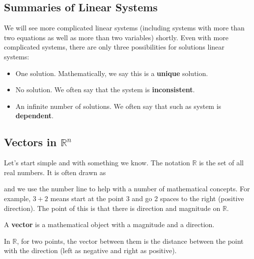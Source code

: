\subsection{Summaries of Linear Systems}

We will see more complicated linear systems (including systems with  more than two equations as well as more than two variables) shortly.  Even with more complicated systems, there are only three  possibilities for solutions linear systems:

\begin{itemize}
  \item One solution.  Mathematically, we say this is a \textbf{unique} solution.
  \item No solution.  We often say that the system is \textbf{inconsistent}. 
  \item An infinite number of solutions.  We often say that such as system is \textbf{dependent}.   
\end{itemize}

\subsection{Vectors in $\mathbb{R}^n$}

Let's start simple and with something we know.  The notation $\mathbb{R}$ is the set of all real numbers.  It is often drawn as
%
\begin{center}
\end{center}
and we use the number line to help with a number of mathematical concepts.  For example, $3 + 2$ means start at the point $3$ and go 2 spaces to the right (positive direction).  The point of this is that there is direction and magnitude on $\mathbb{R}$.

\begin{definition}
A \textbf{vector} is a mathematical object with a magnitude and a direction.
\end{definition}

In $\mathbb{R}$, for two points, the vector between them is the distance between the point with the direction (left as negative and right as positive).

